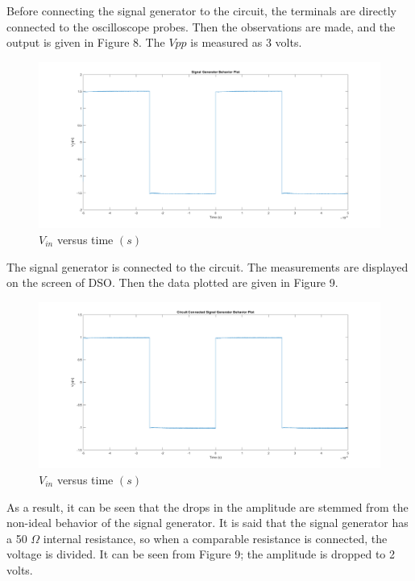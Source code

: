 \documentclass[letterpaper,12pt]{article}
\begin{document}
Before connecting the signal generator to the circuit, the terminals are directly connected to the oscilloscope probes. Then the observations are made, and the output is given in Figure 8. The \(V{pp}\) is measured as 3 volts.

\begin{figure}[H]
	\centering
   \includegraphics[width=1\textwidth]{3a.png}
   \caption{\(V_{in}\) versus time \((s)\) }
\end{figure}  

The signal generator is connected to the circuit. The measurements are displayed on the screen of DSO. Then the data plotted are given in Figure 9.
\begin{figure}[H]
	\centering
   \includegraphics[width=1\textwidth]{3b.png}
   \caption{\(V_{in}\) versus time \((s)\) }
\end{figure}  
As a result, it can be seen that the drops in the amplitude are stemmed from the non-ideal behavior of the signal generator. It is said that the signal generator has a 50 \(\Omega\)  internal resistance, so when a comparable resistance is connected, the voltage is divided. It can be seen from Figure 9; the amplitude is dropped to 2 volts.
\end{document}
